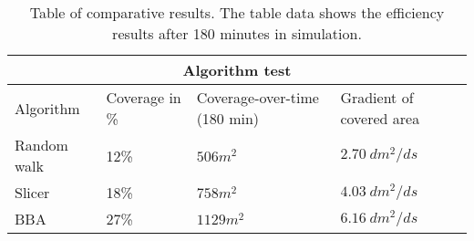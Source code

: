\begin{table}[H]
\begin{adjustbox}{max width=0.5\textwidth, center }
    \centering
    \begin{tabular}{|p{1.7cm}||p{1cm}|p{2cm}|p{1.5cm}|}
    \hline
    \multicolumn{4}{|c|}{Algorithm test} \\
    \hline
    Algorithm & Coverage in \%  & Coverage-over-time (180 min) & Gradient of covered area \\
    \hline
    \hline
    Random walk & 12\% & $506 m^2$ & $2.70~dm^2/ds$ \\
    Slicer & 18\%& $758 m^2$ & $4.03~dm^2/ds$ \\
    BBA & 27\% &$1129 m^2$ & $6.16~dm^2/ds$ \\
    \hline
    \end{tabular}
\end{adjustbox}
\captionsetup{justification=centering,margin=0cm}
\caption{Table of comparative results. The table data shows the efficiency results after 180 minutes in simulation.
}
\label{tab:res}
\end{table}

